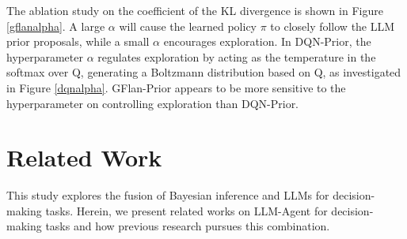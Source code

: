 \documentclass{article} %
\theoremstyle{plain}
\theoremstyle{definition}
\theoremstyle{remark}
\newcommand{\yan}[1]{{ \color{blue}[yan: #1]}}
\begin{document}
{The ablation study on the coefficient of the KL divergence is shown in Figure \ref{gflanalpha}. A large $\alpha$ will cause the learned policy $\pi$ to closely follow the LLM prior proposals, while a small $\alpha$ encourages exploration. In DQN-Prior, the hyperparameter $\alpha$ regulates exploration by acting as the temperature in the softmax over Q, generating a Boltzmann distribution based on Q, as investigated in Figure \ref{dqnalpha}. GFlan-Prior appears to be more sensitive to the hyperparameter on controlling exploration than DQN-Prior.  
\section{Related Work}\label{Sec:RelatedWork}
This study explores the fusion of Bayesian inference and LLMs for decision-making tasks. Herein, %
{we present related works on LLM-Agent for decision-making tasks and how previous research pursues this combination.} 


}
\end{document}
